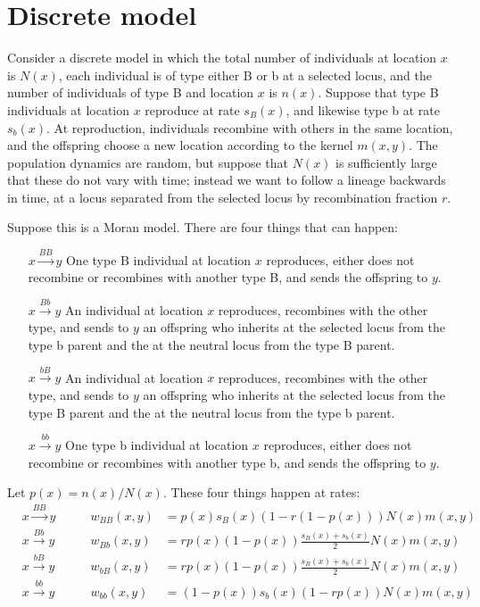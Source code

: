 \documentclass{article}
\begin{document}
\section{Discrete model}

Consider a discrete model in which the total number of individuals at location $x$ is $N(x)$,
each individual is of type either B or b at a selected locus,
and the number of individuals of type B and location $x$ is $n(x)$.
Suppose that type B individuals at location $x$ reproduce at rate $s_B(x)$, 
and likewise type b at rate $s_b(x)$.
At reproduction, individuals recombine with others in the same location,
and the offspring choose a new location according to the kernel $m(x,y)$.
The population dynamics are random, but suppose that $N(x)$ is sufficiently large that these do not vary with time;
instead we want to follow a lineage backwards in time,
at a locus separated from the selected locus by recombination fraction $r$.

Suppose this is a Moran model.
There are four things that can happen:
\begin{enumerate}
    \item[$x\xrightarrow{BB}y$] One type B individual at location $x$ reproduces, 
        either does not recombine or recombines with another type B,
        and sends the offspring to $y$.
    \item[$x\xrightarrow{Bb}y$] An individual at location $x$ reproduces, 
        recombines with the other type,
        and sends to $y$ an offspring
        who inherits at the selected locus from the type b parent 
        and the at the neutral locus from the type B parent.
    \item[$x\xrightarrow{bB}y$] An individual at location $x$ reproduces, 
        recombines with the other type,
        and sends to $y$ an offspring
        who inherits at the selected locus from the type B parent 
        and the at the neutral locus from the type b parent.
    \item[$x\xrightarrow{bb}y$] One type b individual at location $x$ reproduces, 
        either does not recombine or recombines with another type b,
        and sends the offspring to $y$.
\end{enumerate}
Let $p(x) = n(x)/N(x)$.
These four things happen at rates:
\begin{align}
    & x\xrightarrow{BB}y & \qquad w_{BB}(x,y) &= p(x) s_B(x) \left(1 - r (1-p(x)) \right)  N(x) m(x,y) \\
    & x\xrightarrow{Bb}y & \qquad w_{Bb}(x,y) &= r p(x) (1-p(x)) \frac{s_B(x)+s_b(x)}{2} N(x) m(x,y) \\
    & x\xrightarrow{bB}y & \qquad w_{bB}(x,y) &= r p(x) (1-p(x)) \frac{s_B(x)+s_b(x)}{2} N(x) m(x,y) \\
    & x\xrightarrow{bb}y & \qquad w_{bb}(x,y) &= (1-p(x)) s_b(x) \left(1 - r p(x) \right) N(x) m(x,y) 
\end{align}
\end{document}
